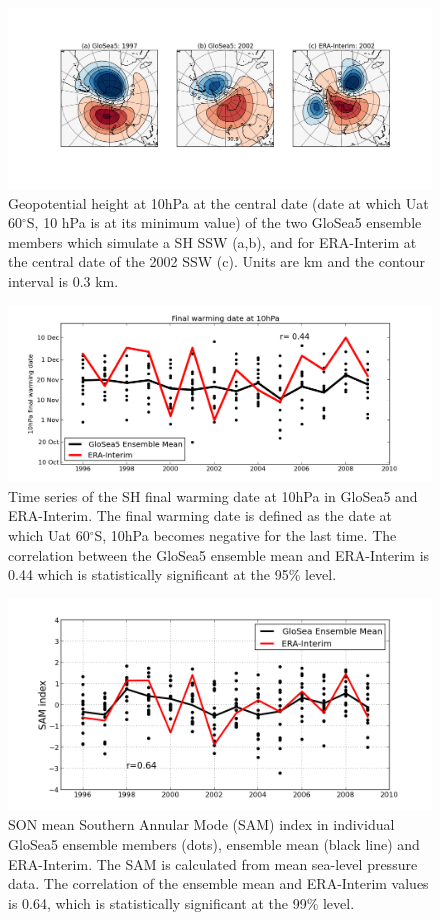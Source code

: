 \begin{figure}[htbp]
\centering
\includegraphics{./figures/sh_ssws.png}
\caption{Geopotential height at 10hPa at the central date (date at which
Uat 60$^{\circ}$S, 10 hPa is at its minimum value) of the two GloSea5
ensemble members which simulate a SH SSW (a,b), and for ERA-Interim at
the central date of the 2002 SSW (c). Units are km and the contour
interval is 0.3 km.}
\end{figure}

\begin{figure}[htbp]
\centering
\includegraphics{./figures/glosea_fw.png}
\caption{Time series of the SH final warming date at 10hPa in GloSea5
and ERA-Interim. The final warming date is defined as the date at which
Uat 60$^{\circ}$S, 10hPa becomes negative for the last time. The
correlation between the GloSea5 ensemble mean and ERA-Interim is 0.44
which is statistically significant at the 95\% level.}
\end{figure}

\begin{figure}[htbp]
\centering
\includegraphics{./figures/sam.png}
\caption{SON mean Southern Annular Mode (SAM) index in individual
GloSea5 ensemble members (dots), ensemble mean (black line) and
ERA-Interim. The SAM is calculated from mean sea-level pressure data.
The correlation of the ensemble mean and ERA-Interim values is 0.64,
which is statistically significant at the 99\% level.}
\end{figure}

